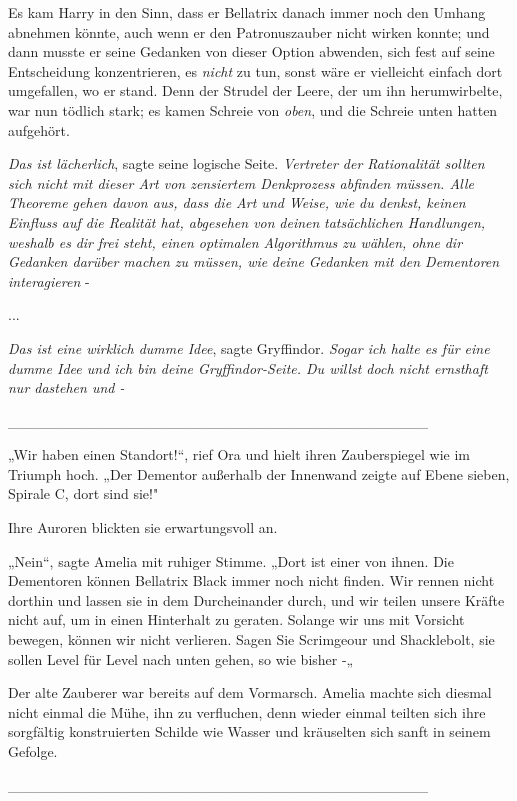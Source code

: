 {Es kam Harry in den Sinn, dass er Bellatrix danach immer noch den Umhang abnehmen könnte, auch wenn er den Patronuszauber nicht wirken konnte; und dann musste er seine Gedanken von dieser Option abwenden, sich fest auf seine Entscheidung konzentrieren, es \emph{nicht} zu tun, sonst wäre er vielleicht einfach dort umgefallen, wo er stand. Denn der Strudel der Leere, der um ihn herumwirbelte, war nun tödlich stark; es kamen Schreie von \emph{oben}, und die Schreie unten hatten aufgehört.

\emph{Das ist lächerlich}, sagte seine logische Seite. \emph{Vertreter der Rationalität sollten sich nicht mit dieser Art von zensiertem Denkprozess abfinden müssen. Alle Theoreme gehen davon aus, dass die Art und Weise, wie du denkst, keinen Einfluss auf die Realität hat, abgesehen von} \emph{deinen} \emph{tatsächlichen Handlungen, weshalb es} \emph{dir} \emph{frei steht, einen optimalen Algorithmus zu wählen, ohne} \emph{dir} \emph{Gedanken darüber machen zu müssen, wie} \emph{deine} \emph{Gedanken mit den Dementoren interagieren} -

...

\emph{Das ist eine wirklich dumme Idee}, sagte Gryffindor. \emph{Sogar ich halte es für eine dumme Idee und ich bin deine Gryffindor-Seite. Du willst doch nicht ernsthaft nur dastehen und -}

\_\_\_\_\_\_\_\_\_\_\_\_\_\_\_\_\_\_\_\_\_\_\_\_\_\_\_\_\_\_\_\_\_\_\_\_\_\_\_\_

„Wir haben einen Standort!“, rief Ora und hielt ihren Zauberspiegel wie im Triumph hoch. „Der Dementor außerhalb der Innenwand zeigte auf Ebene sieben, Spirale C, dort sind sie!"

Ihre Auroren blickten sie erwartungsvoll an.

„Nein“, sagte Amelia mit ruhiger Stimme. „Dort ist einer von ihnen. Die Dementoren können Bellatrix Black immer noch nicht finden. Wir rennen nicht dorthin und lassen sie in dem Durcheinander durch, und wir teilen unsere Kräfte nicht auf, um in einen Hinterhalt zu geraten. Solange wir uns mit Vorsicht bewegen, können wir nicht verlieren. Sagen Sie Scrimgeour und Shacklebolt, sie sollen Level für Level nach unten gehen, so wie bisher -„

Der alte Zauberer war bereits auf dem Vormarsch. Amelia machte sich diesmal nicht einmal die Mühe, ihn zu verfluchen, denn wieder einmal teilten sich ihre sorgfältig konstruierten Schilde wie Wasser und kräuselten sich sanft in seinem Gefolge.

\_\_\_\_\_\_\_\_\_\_\_\_\_\_\_\_\_\_\_\_\_\_\_\_\_\_\_\_\_\_\_\_\_\_\_\_\_\_\_\_

}
